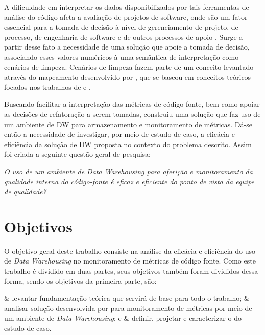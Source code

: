 A dificuldade em interpretar os dados disponibilizados por tais ferramentas de análise do código afeta a avaliação de projetos de software, onde são um fator essencial para a tomada de decisão à nível de gerenciamento de projeto, de processo, de engenharia de software e de outros processos de apoio \cite{pandian_software_2004}. Surge a partir desse fato a necessidade de uma solução que apoie a tomada de decisão, associando esses valores numéricos à uma semântica de interpretação como cenários de limpeza. Cenários de limpeza fazem parte de um conceito levantado através do mapeamento desenvolvido por \cite{Machini2010}, que se baseou em conceitos teóricos focados nos trabalhos de  e . 

Buscando facilitar a interpretação das métricas de código fonte, bem como apoiar as decisões de refatoração a serem tomadas,  construiu uma solução que faz uso de um ambiente de DW para armazenamento e monitoramento de métricas. Dá-se então a necessidade de investigar, por meio de estudo de caso, a eficácia e eficiência da solução de DW proposta no contexto do problema descrito. Assim foi criada a seguinte questão geral de pesquisa:

\textit{O uso de um ambiente de Data Warehousing para aferição e monitoramento da qualidade interna do código-fonte é eficaz e eficiente do ponto de vista da equipe de qualidade?}


\section{Objetivos}

O objetivo geral deste trabalho consiste na análise da eficácia e eficiência do uso de \textit{Data Warehousing} no monitoramento de métricas de código fonte. Como este trabalho é dividido em duas partes, seus objetivos também foram divididos dessa forma, sendo os objetivos da primeira parte, são:

\begin{easylist}[itemize]	
	
	& levantar fundamentação teórica que servirá de base para todo o trabalho;
	& analisar solução desenvolvida por  para monitoramento de métricas por meio de um ambiente de \textit{Data Warehousing}; e
	& definir, projetar e caracterizar o do estudo de caso.
	
	
	\end{easylist}	

